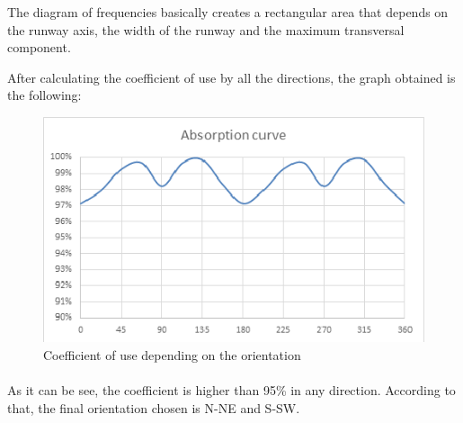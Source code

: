 		The diagram of frequencies basically creates a rectangular area that depends on the runway	axis, the width of the runway and the maximum transversal component.
		
		After calculating the coefficient of use by all the directions, the graph obtained is the following:

		\begin{figure}[H]
			\centering
			\includegraphics[clip, trim=0cm 0cm 0cm 0cm, width=1\textwidth]{./images/WIND/GRAPH}
			\caption{Coefficient of use depending on the orientation} %
			\label{} %
		\end{figure}
		
		\paragraph{}As it can be see, the coefficient is higher than 95\% in any direction. According to that, the final orientation chosen is N-NE and S-SW.